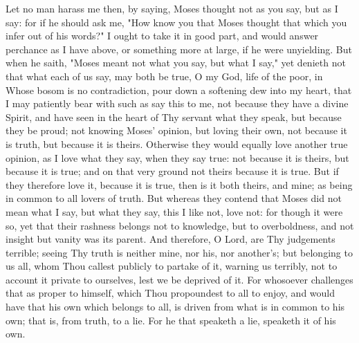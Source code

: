 \documentclass[b5paper,openright,12pt,twoside]{book}
\begin{document}
Let no man harass me then, by saying, Moses thought not as you say, but
as I say: for if he should ask me, "How know you that Moses thought that
which you infer out of his words?" I ought to take it in good part, and
would answer perchance as I have above, or something more at large, if
he were unyielding. But when he saith, "Moses meant not what you say,
but what I say," yet denieth not that what each of us say, may both be
true, O my God, life of the poor, in Whose bosom is no contradiction,
pour down a softening dew into my heart, that I may patiently bear with
such as say this to me, not because they have a divine Spirit, and have
seen in the heart of Thy servant what they speak, but because they be
proud; not knowing Moses' opinion, but loving their own, not because it
is truth, but because it is theirs. Otherwise they would equally love
another true opinion, as I love what they say, when they say true: not
because it is theirs, but because it is true; and on that very ground
not theirs because it is true. But if they therefore love it, because
it is true, then is it both theirs, and mine; as being in common to all
lovers of truth. But whereas they contend that Moses did not mean what
I say, but what they say, this I like not, love not: for though it
were so, yet that their rashness belongs not to knowledge, but to
overboldness, and not insight but vanity was its parent. And therefore,
O Lord, are Thy judgements terrible; seeing Thy truth is neither mine,
nor his, nor another's; but belonging to us all, whom Thou callest
publicly to partake of it, warning us terribly, not to account
it private to ourselves, lest we be deprived of it. For whosoever
challenges that as proper to himself, which Thou propoundest to all to
enjoy, and would have that his own which belongs to all, is driven from
what is in common to his own; that is, from truth, to a lie. For he that
speaketh a lie, speaketh it of his own.
\end{document}
